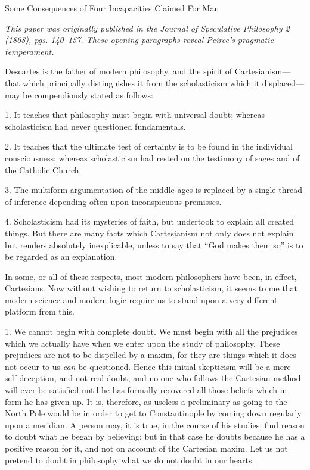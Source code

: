\documentclass[]{article}
\newcommand{\hbreak}{\par\noindent\begin{tabular*}{\linewidth}{c}\hline\hline\end{tabular*}\par}
\newcommand{\itemtitle}[1]{\pagebreak[2]\hbreak\begin{center}{\Large\sc #1}\end{center}}
\newcommand{\itemcomment}[1]{\noindent\emph{#1}}
\begin{document}
\itemtitle{[from] Some Consequences of Four Incapacities Claimed For Man}
\itemcomment{This paper was originally published in the \emph{Journal of Speculative Philosophy} 2 (1868), pgs. 140--157. These opening paragraphs reveal Peirce's pragmatic temperament.}

Descartes is the father of modern philosophy, and the spirit of Cartesianism--- that which principally distinguishes it from the scholasticism which it displaced--- may be compendiously stated as follows:

1. It teaches that philosophy must begin with universal doubt; whereas scholasticism had never questioned fundamentals.

2. It teaches that the ultimate test of certainty is to be found in the individual consciousness; whereas scholasticism had rested on the testimony of sages and of the Catholic Church.

3. The multiform argumentation of the middle ages is replaced by a single thread of inference depending often upon inconspicuous premisses.

4. Scholasticism had its mysteries of faith, but undertook to explain all created things. But there are many facts which Cartesianism not only does not explain but renders absolutely inexplicable, unless to say that ``God makes them so'' is to be regarded as an explanation.

In some, or all of these respects, most modern philosophers have been, in effect, Cartesians. Now without wishing to return to scholasticism, it seems to me that modern science and modern logic require us to stand upon a very different platform from this.

1. We cannot begin with complete doubt. We must begin with all the prejudices which we actually have when we enter upon the study of philosophy. These prejudices are not to be dispelled by a maxim, for they are things which it does not occur to us \emph{can} be questioned. Hence this initial skepticism will be a mere self-deception, and not real doubt; and no one who follows the Cartesian method will ever be satisfied until he has formally recovered all those beliefs which in form he has given up. It is, therefore, as useless a preliminary as going to the North Pole would be in order to get to Constantinople by coming down regularly upon a meridian. A person may, it is true, in the course of his studies, find reason to doubt what he began by believing; but in that case he doubts because he has a positive reason for it, and not on account of the Cartesian maxim. Let us not pretend to doubt in philosophy what we do not doubt in our hearts.
\end{document}

